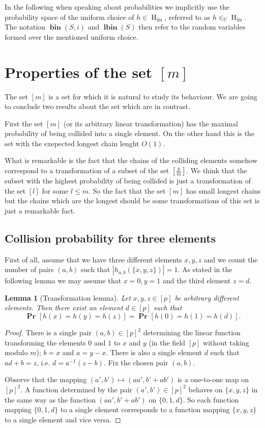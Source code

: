 \documentclass{article}
\newcommand{\hlin}{\operatorname{H}_{\operatorname{lin}}}
\newcommand{\vbin}[2]{\operatorname{\mathbf{bin}}({#1}, {#2})}
\newcommand{\vlbin}[1]{\operatorname{\mathbf{lbin}}({#1})}
\newcommand{\probs}[2]{\operatorname{\mathbf{Pr}}_{{#1}}\left[{#2}\right]}
\newcommand{\prob}[1]{\probs{}{#1}}
\newcommand{\inu}{\in_U}
\newtheorem{lemma}{Lemma}
\begin{document}
In the following when speaking about probabilities we implicitly use the probability space of the uniform choice of $h \in \hlin$, referred to as $h \inu \hlin$.
The notation $\vbin{S}{i}$ and $\vlbin{S}$ then refer to the random variables formed over the mentioned uniform choice.

\section{Properties of the set $[m]$}

The set $[m]$ is a set for which it is natural to study its behaviour.
We are going to conclude two results about the set which are in contrast.

First the set $[m]$ (or its arbitrary linear transformation) has the maximal probability of being collided into a single element.
On the other hand this is the set with the exepected longest chain lenght $O(1)$.

What is remarkable is the fact that the chains of the colliding elements somehow correspond to a transformation of a subset of the set $[\frac{p}{m}]$.
We think that the subset with the highest probability of being collided is just a transformation of the set $[l]$ for some $l \leq m$.
So the fact that the set $[m]$ has small longest chains but the chains which are the longest should be some transformations of this set is just a remarkable fact.

\subsection{Collision probability for three elements}

First of all, assume that we have three different elements $x, y, z$ and we count the number of pairs $(a, b)$ such that $|h_{a, b}(\{x, y, z\})| = 1$.
As stated in the following lemma we may assume that $x = 0, y = 1$ and the third element $z = d$.

\begin{lemma}[Transformation lemma]
Let $x, y, z \in [p]$ be arbitrary different elements. Then there exist an element $d \in [p]$ such that
\[
\prob{h(x) = h(y) = h(z)} = \prob{h(0) = h(1) = h(d)}.
\]
\end{lemma}
\begin{proof}
There is a single pair $(a, b) \in [p] ^ 2$ determining the linear function transforming the elements $0$ and $1$ to $x$ and $y$ (in the field $[p]$ without taking modulo $m$); $b = x$ and $a = y - x$.
There is also a single element $d$ such that $ad + b = z$, i.e. $d = a ^ {-1}(z - b)$.
Fix the chosen pair $(a, b)$.

Observe that the mapping $(a', b') \mapsto (aa', b' + ab')$ is a one-to-one map on $[p]^2$.
A function determined by the pair $(a', b') \in [p]^2$ behaves on $\{x, y, z\}$ in the same way as the function $(aa', b' + ab')$ on $\{0, 1, d\}$.
So each function mapping $\{0, 1, d\}$ to a single element corresponds to a function mapping $\{x, y, z\}$ to a single element and vice versa.
\end{proof}
\end{document}
